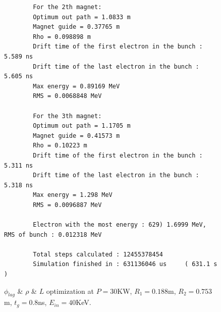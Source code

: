 \documentclass[a4paper,oneside,12pt]{report}
\numberwithin{equation}{chapter}
\begin{document}
{\begin{figure}[H]
\begin{verbatim}
        For the 2th magnet:
        Optimum out path = 1.0833 m
        Magnet guide = 0.37765 m
        Rho = 0.098898 m
        Drift time of the first electron in the bunch : 5.589 ns
        Drift time of the last electron in the bunch : 5.605 ns
        Max energy = 0.89169 MeV
        RMS = 0.0068848 MeV
        
        For the 3th magnet:
        Optimum out path = 1.1705 m
        Magnet guide = 0.41573 m
        Rho = 0.10223 m
        Drift time of the first electron in the bunch : 5.311 ns
        Drift time of the last electron in the bunch : 5.318 ns
        Max energy = 1.298 MeV
        RMS = 0.0096887 MeV
        
        Electron with the most energy : 629) 1.6999 MeV,	RMS of bunch : 0.012318 MeV
        
        Total steps calculated : 12455378454
        Simulation finished in : 631136046 us     ( 631.1 s )        
    \end{verbatim}
    \vspace{0pt}
\caption{$\phi_{lag}$ \& $\rho$ \& $L$ optimization at $P=30$KW, $R_1=0.188$m, $R_2=0.753$m, $t_g=0.8$ns, $E_{in}=40$KeV.}
\label{fig:lout_opt_08ns_Erms}
\end{figure}

}
\end{document}
